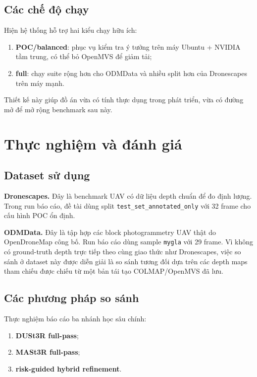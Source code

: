 \documentclass[12pt,a4paper,oneside]{report}
\begin{document}
\section{Các chế độ chạy}

Hiện hệ thống hỗ trợ hai kiểu chạy hữu ích:
\begin{enumerate}[leftmargin=1.5em]
  \item \textbf{POC/balanced}: phục vụ kiểm tra ý tưởng trên máy Ubuntu + NVIDIA tầm trung, có thể bỏ OpenMVS để giảm tải;
  \item \textbf{full}: chạy suite rộng hơn cho ODMData và nhiều split hơn của Dronescapes trên máy mạnh.
\end{enumerate}

Thiết kế này giúp đồ án vừa có tính thực dụng trong phát triển, vừa có đường mở để mở rộng benchmark sau này.

\chapter{Thực nghiệm và đánh giá}

\section{Dataset sử dụng}

\textbf{Dronescapes.} Đây là benchmark UAV có dữ liệu depth chuẩn để đo định lượng. Trong run báo cáo, đề tài dùng split \texttt{test\_set\_annotated\_only} với 32 frame cho cấu hình POC ổn định.

\textbf{ODMData.} Đây là tập hợp các block photogrammetry UAV thật do OpenDroneMap công bố. Run báo cáo dùng sample \texttt{mygla} với 29 frame. Vì không có ground-truth depth trực tiếp theo cùng giao thức như Dronescapes, việc so sánh ở dataset này được diễn giải là so sánh tương đối dựa trên các depth maps tham chiếu được chiếu từ một bản tái tạo COLMAP/OpenMVS đã lưu.

\section{Các phương pháp so sánh}

Thực nghiệm báo cáo ba nhánh học sâu chính:
\begin{enumerate}[leftmargin=1.5em]
  \item \textbf{DUSt3R full-pass};
  \item \textbf{MASt3R full-pass};
  \item \textbf{risk-guided hybrid refinement}.
\end{enumerate}
\end{document}
